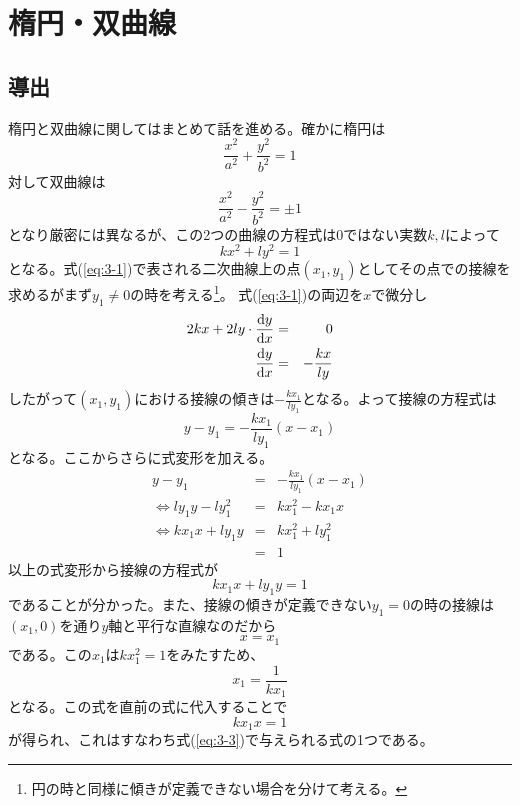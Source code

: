 \documentclass{jsarticle} \usepackage{graphics} \usepackage{amsmath} \usepackage{amssymb} \usepackage{cases}
\newcommand{\pt}{$(x_1,y_1)$}
\begin{document}
    \section{楕円・双曲線}
    \subsection{導出}
    楕円と双曲線に関してはまとめて話を進める。確かに楕円は
    \[
    \frac{x^2}{a^2} +\frac{y^2}{b^2}=1
    \]
    対して双曲線は
    \[
    \frac{x^2}{a^2} -\frac{y^2}{b^2}=\pm 1
    \]
    となり厳密には異なるが、この2つの曲線の方程式は0ではない実数$k,l$によって
    \begin{equation}
        kx^2 +ly^2 =1
        \label{eq:3-1}
    \end{equation}
    となる。式(\ref{eq:3-1})で表される二次曲線上の点\pt としてその点での接線を求めるがまず$y_1 \neq 0$の時を考える\footnote{円の時と同様に傾きが定義できない場合を分けて考える。}。
    式(\ref{eq:3-1})の両辺を$x$で微分し
    \begin{eqnarray*}
        2kx +2ly \cdot \frac{{\rm d}y}{{\rm d}x} &=& 0\\
        \frac{{\rm d}y}{{\rm d}x} &=& -\frac{kx}{ly}
    \end{eqnarray*}
    したがって\pt における接線の傾きは$-\frac{kx_1}{ly_1}$となる。よって接線の方程式は
    \begin{equation}
        y-y_1=-\frac{kx_1}{ly_1} (x-x_1)
        \label{eq:3-2}
    \end{equation}
    となる。ここからさらに式変形を加える。
    \begin{eqnarray*}
        y-y_1 &=& -\frac{kx_1}{ly_1} (x-x_1)\\
        \Leftrightarrow ly_1 y -ly_1^2 &=& kx_1^2 -kx_1 x\\
        \Leftrightarrow kx_1 x +ly_1 y &=& kx_1^2 +ly_1^2\\
        &=& 1
    \end{eqnarray*}
    以上の式変形から接線の方程式が
    \begin{equation}
        kx_1 x +ly_1 y=1
        \label{eq:3-3}
    \end{equation}
    であることが分かった。また、接線の傾きが定義できない$y_1=0$の時の接線は$(x_1,0)$を通り$y$軸と平行な直線なのだから
    \[
    x=x_1
    \]
    である。この$x_1$は$kx_1^2=1$をみたすため、
    \[
    x_1=\frac{1}{kx_1}
    \]
    となる。この式を直前の式に代入することで
    \[
    kx_1 x=1
    \]
    が得られ、これはすなわち式(\ref{eq:3-3})で与えられる式の1つである。
\end{document}

